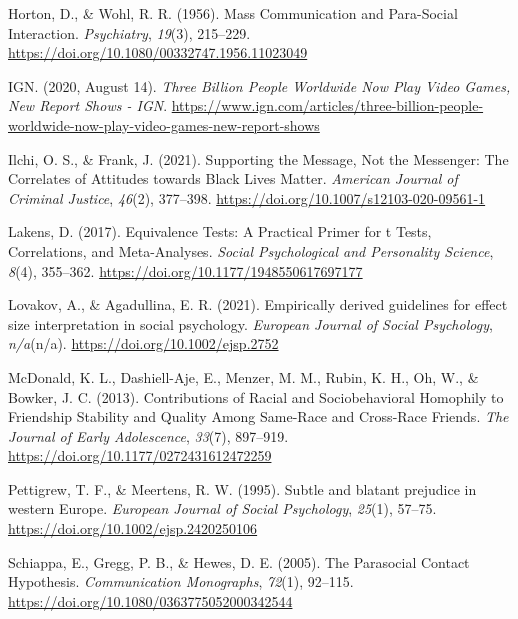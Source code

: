 \documentclass[
  english,
  man, noextraspace,floatsintext]{apa6}
\newlength{\cslhangindent}
\newlength{\cslentryspacingunit} %
\newenvironment{CSLReferences}[2] %
 {%
  \setlength{\parindent}{0pt}
  \ifodd #1
  \let\oldpar\par
  \def\par{\hangindent=\cslhangindent\oldpar}
  \fi
  \setlength{\parskip}{#2\cslentryspacingunit}
 }%
 {}
\begin{document}
\begin{CSLReferences}{1}{0}
\leavevmode{}%
Horton, D., \& Wohl, R. R. (1956). Mass {Communication} and {Para}-{Social Interaction}. \emph{Psychiatry}, \emph{19}(3), 215--229. \url{https://doi.org/10.1080/00332747.1956.11023049}

\leavevmode{}%
IGN. (2020, August 14). \emph{Three {Billion People Worldwide Now Play Video Games}, {New Report Shows} - {IGN}}. \url{https://www.ign.com/articles/three-billion-people-worldwide-now-play-video-games-new-report-shows}

\leavevmode{}%
Ilchi, O. S., \& Frank, J. (2021). Supporting the {Message}, {Not} the {Messenger}: {The Correlates} of {Attitudes} towards {Black Lives Matter}. \emph{American Journal of Criminal Justice}, \emph{46}(2), 377--398. \url{https://doi.org/10.1007/s12103-020-09561-1}

\leavevmode{}%
Lakens, D. (2017). Equivalence {Tests}: {A Practical Primer} for t {Tests}, {Correlations}, and {Meta}-{Analyses}. \emph{Social Psychological and Personality Science}, \emph{8}(4), 355--362. \url{https://doi.org/10.1177/1948550617697177}

\leavevmode{}%
Lovakov, A., \& Agadullina, E. R. (2021). Empirically derived guidelines for effect size interpretation in social psychology. \emph{European Journal of Social Psychology}, \emph{n/a}(n/a). \url{https://doi.org/10.1002/ejsp.2752}

\leavevmode{}%
McDonald, K. L., Dashiell-Aje, E., Menzer, M. M., Rubin, K. H., Oh, W., \& Bowker, J. C. (2013). Contributions of {Racial} and {Sociobehavioral Homophily} to {Friendship Stability} and {Quality Among Same}-{Race} and {Cross}-{Race Friends}. \emph{The Journal of Early Adolescence}, \emph{33}(7), 897--919. \url{https://doi.org/10.1177/0272431612472259}

\leavevmode{}%
Pettigrew, T. F., \& Meertens, R. W. (1995). Subtle and blatant prejudice in western {Europe}. \emph{European Journal of Social Psychology}, \emph{25}(1), 57--75. \url{https://doi.org/10.1002/ejsp.2420250106}

\leavevmode{}%
Schiappa, E., Gregg, P. B., \& Hewes, D. E. (2005). The {Parasocial Contact Hypothesis}. \emph{Communication Monographs}, \emph{72}(1), 92--115. \url{https://doi.org/10.1080/0363775052000342544}


\end{CSLReferences}
\end{document}
